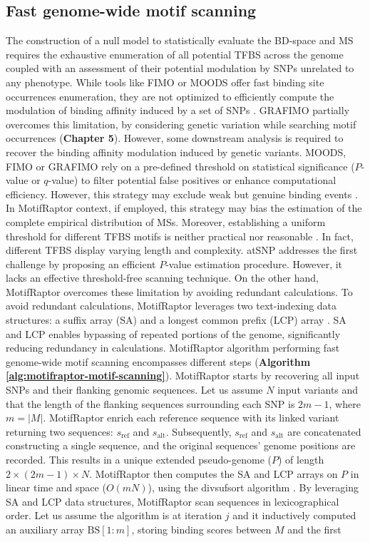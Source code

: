 \documentclass[a4paper, titlepage, openright]{book}
\newcommand{\grafimo}{GRAFIMO\xspace}
\newcommand{\motifraptor}{MotifRaptor\xspace}
\begin{document}
\subsection{Fast genome-wide motif scanning}
The construction of a null model to statistically evaluate the BD-space and MS requires the exhaustive enumeration of all potential TFBS across the genome coupled with an assessment of their potential modulation by SNPs unrelated to any phenotype. While tools like FIMO or MOODS offer fast binding site occurrences enumeration, they are not optimized to efficiently compute the modulation of binding affinity induced by a set of SNPs \citep{zuo2015atsnp}. \grafimo partially overcomes this limitation, by considering genetic variation while searching motif occurrences (\textbf{Chapter 5}). However, some downstream analysis is required to recover the binding affinity modulation induced by genetic variants. MOODS, FIMO or \grafimo rely on a pre-defined threshold on statistical significance ($P$-value or $q$-value) to filter potential false positives or enhance computational efficiency. However, this strategy may exclude weak but genuine binding events \citep{boeva2016analysis,tognon2023survey}. In \motifraptor context, if employed, this strategy may bias the estimation of the complete empirical distribution of MSs. Moreover, establishing a uniform threshold for different TFBS motifs is neither practical nor reasonable \citep{tognon2023survey}. In fact, different TFBS display varying length and complexity. atSNP \citep{zuo2015atsnp} addresses the first challenge by proposing an efficient $P$-value estimation procedure. However, it lacks an effective threshold-free scanning technique. On the other hand, \motifraptor overcomes these limitation by avoiding redundant calculations. To avoid redundant calculations, \motifraptor leverages two text-indexing data structures: a suffix array (SA) \citep{puglisi2007taxonomy} and a longest common prefix (LCP) array \citep{landau2001linear}. SA and LCP enables bypassing of repeated portions of the genome, significantly reducing redundancy in calculations. \motifraptor algorithm performing fast genome-wide motif scanning encompasses different steps (\textbf{Algorithm \ref{alg:motifraptor-motif-scanning}}). \motifraptor starts by recovering all input SNPs and their flanking genomic sequences. Let us assume $N$ input variants and that the length of the flanking sequences surrounding each SNP is $2m-1$, where $m = |M|$. \motifraptor enrich each reference sequence with its linked variant returning two sequences: $s_{\text{ref}}$ and $s_{\text{alt}}$. Subsequently, $s_{\text{ref}}$ and $s_{\text{alt}}$ are concatenated constructing a single sequence, and the original sequences' genome positions are recorded. This results in a unique extended pseudo-genome ($P$) of length $2 \times (2m-1) \times N$. \motifraptor then computes the SA and LCP arrays on $P$ in linear time and space ($O(mN)$), using the divsufsort algorithm \citep{fischer2017dismantling}. By leveraging SA and LCP data structures, \motifraptor scan sequences in lexicographical order. Let us assume the algorithm is at iteration $j$ and it inductively computed an auxiliary array $\text{BS}[1:m]$, storing binding scores between $M$ and the first 
\end{document}
